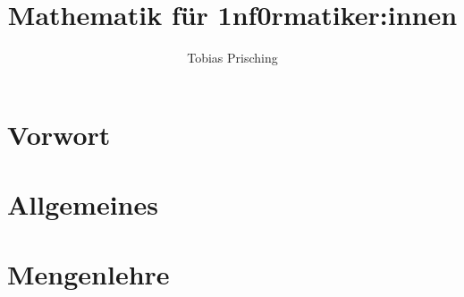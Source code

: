 \documentclass[a4paper,10pt,ngerman]{scrreprt}
\title{Mathematik für 1nf0rmatiker:innen}
\author{Tobias Prisching}
\date{ }
\theoremstyle{definition}
\begin{document}
	
	
	\maketitle
	
	\newpage

	\tableofcontents
	
	\clearpage
	\restoregeometry

	\newpage
	\chapter*{Vorwort}\label{Vorwort}
	
	
	\newpage
	\chapter{Allgemeines}\label{kapitel:Allgemeines}	
		
	
	\newpage
	\chapter{Mengenlehre}\label{kapitel:Mengenlehre}	
	
	
\end{document}
